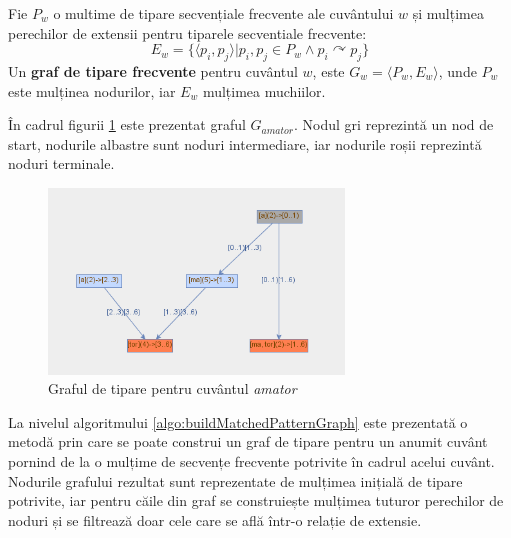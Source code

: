 \begin{defi}
Fie $P_w$ o multime de tipare secvențiale frecvente ale cuvântului $w$ și mulțimea perechilor de extensii pentru tiparele secventiale frecvente: 
\begin{equation}
E_w = \{\langle p_i, p_j \rangle \vert p_i,p_j \in P_w \wedge p_i \curvearrowright p_j\}
\end{equation}
Un \textbf{graf de tipare frecvente} pentru cuvântul $w$, este $G_w = \langle P_w, E_w \rangle$, unde $P_w$ este mulținea nodurilor, iar $E_w$ mulțimea muchiilor. 
\end{defi}

\begin{ex}
În cadrul figurii \ref{fig:rosil-amator} este prezentat graful $G_{amator}$. Nodul gri reprezintă un nod de start, nodurile albastre sunt noduri intermediare, iar nodurile roșii reprezintă noduri terminale. 
\end{ex}

\begin{figure}[h!]
    \centering
    \includegraphics[width=0.7\textwidth]{figures/rosil-amator.png}
    \caption{Graful de tipare pentru cuvântul \textit{amator}}
    \label{fig:rosil-amator}
\end{figure}

La nivelul algoritmului \ref{algo:buildMatchedPatternGraph} este prezentată o metodă prin care se poate construi un graf de tipare pentru un anumit cuvânt pornind de la o mulțime de secvențe frecvente potrivite în cadrul acelui cuvânt. Nodurile grafului rezultat sunt reprezentate de mulțimea inițială de tipare potrivite, iar pentru căile din graf se construiește mulțimea tuturor perechilor de noduri și se filtrează doar cele care se află într-o relație de extensie.

